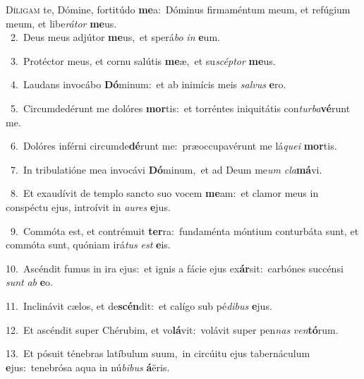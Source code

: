 \lettrine{\initial\textcolor{\initialcolor}{D}}{íligam} te, Dómine, fortitúdo \textbf{me}\-a:~\star Dóminus firmaméntum meum, et refúgium meum, et libe\-\textit{rá}\-\textit{tor} \textbf{me}\-us.\\
{\numbfont\textcolor{\numbcolor}{~2.}}~Deus meus adjútor \textbf{me}\-us,~\star et sperá\textit{bo} \textit{in} \textbf{e}\-um.\par
{\numbfont\textcolor{\numbcolor}{~3.}}~Protéctor meus, et cornu salútis \textbf{me}\-æ,~\star et su\-\textit{scép}\-\textit{tor} \textbf{me}\-us.\par
{\numbfont\textcolor{\numbcolor}{~4.}}~Laudans invocábo \textbf{Dó}\-minum:~\star et ab inimícis meis \textit{sal}\-\textit{vus} \textbf{e}\-ro.\par
{\numbfont\textcolor{\numbcolor}{~5.}}~Circumdedérunt me dolóres \textbf{mor}\-tis:~\star et torréntes iniquitátis con\-\textit{tur}\-\textit{ba}\textbf{vé}runt me.\par
{\numbfont\textcolor{\numbcolor}{~6.}}~Dolóres inférni circumde\-\textbf{dé}\-runt me:~\star præoccupavérunt me lá\-\textit{que}\-\textit{i} \textbf{mor}\-tis.\par
{\numbfont\textcolor{\numbcolor}{~7.}}~In tribulatióne mea invocávi \textbf{Dó}\-minum,~\star et ad Deum me\textit{um} \textit{cla}\-\textbf{má}vi.\par
{\numbfont\textcolor{\numbcolor}{~8.}}~Et exaudívit de templo sancto suo vocem \textbf{me}\-am:~\star et clamor meus in conspéctu ejus, introívit in \textit{au}\-\textit{res} \textbf{e}\-jus.\par
{\numbfont\textcolor{\numbcolor}{~9.}}~Commóta est, et contrémuit \textbf{ter}\-ra:~\star fundaménta móntium conturbáta sunt, et commóta sunt, quóniam irá\textit{tus} \textit{est} \textbf{e}\-is.\par
{\numbfont\textcolor{\numbcolor}{10.}}~Ascéndit fumus in ira ejus:~\dagger et ignis a fácie ejus ex\-\textbf{ár}\-sit:~\star carbónes succénsi \textit{sunt} \textit{ab} \textbf{e}\-o.\par
{\numbfont\textcolor{\numbcolor}{11.}}~Inclinávit cælos, et de\-\textbf{scén}\-dit:~\star et calígo sub pé\-\textit{di}\-\textit{bus} \textbf{e}\-jus.\par
{\numbfont\textcolor{\numbcolor}{12.}}~Et ascéndit super Chérubim, et vo\-\textbf{lá}\-vit:~\star volávit super pen\textit{nas} \textit{ven}\-\textbf{tó}rum.\par
{\numbfont\textcolor{\numbcolor}{13.}}~Et pósuit ténebras latíbulum suum,~\dagger in circúitu ejus tabernáculum \textbf{e}\-jus:~\star tenebrósa aqua in nú\-\textit{bi}\-\textit{bus} \textbf{á}\-ëris.\par
